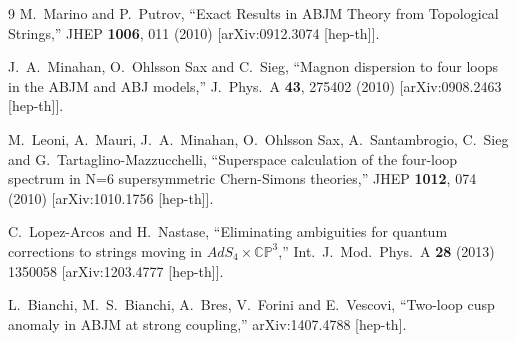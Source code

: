 \documentclass[a4paper,11pt]{article}
\numberwithin{equation}{section}
\begin{document}
\begin{thebibliography} {9}
  M.~Marino and P.~Putrov,
  ``Exact Results in ABJM Theory from Topological Strings,''
  JHEP {\bf 1006}, 011 (2010)
  [arXiv:0912.3074 [hep-th]].

  J.~A.~Minahan, O.~Ohlsson Sax and C.~Sieg,
  ``Magnon dispersion to four loops in the ABJM and ABJ models,''
  J.\ Phys.\ A {\bf 43}, 275402 (2010)
  [arXiv:0908.2463 [hep-th]].

  M.~Leoni, A.~Mauri, J.~A.~Minahan, O.~Ohlsson Sax, A.~Santambrogio, C.~Sieg and G.~Tartaglino-Mazzucchelli,
  ``Superspace calculation of the four-loop spectrum in N=6 supersymmetric Chern-Simons theories,''
  JHEP {\bf 1012}, 074 (2010)
  [arXiv:1010.1756 [hep-th]].

  C.~Lopez-Arcos and H.~Nastase,
  ``Eliminating ambiguities for quantum corrections to strings moving in $AdS_4\times \mathbb{CP}^3$,''
  Int.\ J.\ Mod.\ Phys.\ A {\bf 28} (2013) 1350058
  [arXiv:1203.4777 [hep-th]].

  L.~Bianchi, M.~S.~Bianchi, A.~Bres, V.~Forini and E.~Vescovi,
  ``Two-loop cusp anomaly in ABJM at strong coupling,''
  arXiv:1407.4788 [hep-th].

  
\end{thebibliography}
  
\end{document}
